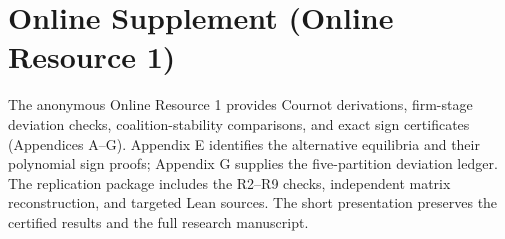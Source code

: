 \documentclass[12pt,review,authoryear,nopreprintline]{elsarticle}
\begin{document}
\section*{Online Supplement (Online Resource 1)}
The anonymous Online Resource 1 provides Cournot derivations, firm-stage deviation checks, coalition-stability comparisons, and exact sign certificates (Appendices A--G). Appendix E identifies the alternative equilibria and their polynomial sign proofs; Appendix G supplies the five-partition deviation ledger. The replication package includes the R2--R9 checks, independent matrix reconstruction, and targeted Lean sources. The short presentation preserves the certified results and the full research manuscript.



\end{document}
